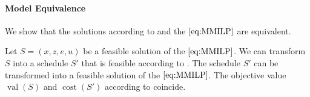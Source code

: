 \newpage

\paragraph{Model Equivalence} \parfill

We show that the solutions according to  and the $\eqref{eq:MMILP}$ are equivalent.

\begin{theorem}
\label{thm:equivalence_setting_mmilp}

Let ${S=\left(x,z,e,u\right)}$ be a feasible solution of the $\eqref{eq:MMILP}$. We can transform $S$ into a schedule $S'$ that is feasible according to . The schedule $S'$ can be transformed into a feasible solution of the $\eqref{eq:MMILP}$. The objective value $\operatorname{val}(S)$ and $\operatorname{cost}\left(S'\right)$ according to  coincide.

\end{theorem}

